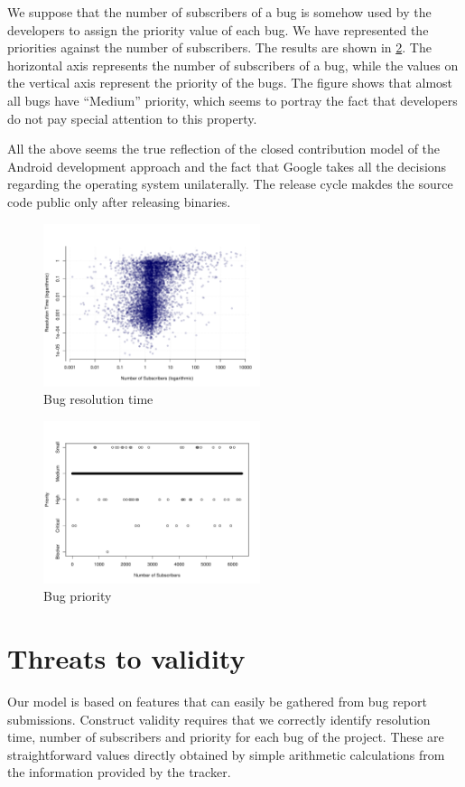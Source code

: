 \documentclass[10pt, conference, compsocconf]{IEEEtran}
\begin{document}
We suppose that the number of  subscribers of a bug is somehow used by the developers to assign the priority value of each bug. We have represented the priorities against the number of subscribers. The results are shown in \ref{fig:stars-priority}. The horizontal axis represents the number of subscribers of a bug, while the values on the vertical axis represent the priority of the bugs. The figure shows that almost all bugs have “Medium” priority, which seems to portray the fact that developers do not pay special attention to this property.

All the above seems the true reflection of the closed contribution model of the Android development approach and the fact that Google takes all the decisions regarding the operating system unilaterally. The release cycle makdes the source code public only after releasing binaries. 

\begin{figure}[!t]
\centering
\includegraphics[width=2.5in]{stars-duration-log}
\caption{Bug resolution time}
\label{fig:stars-duration}
\end{figure}

\begin{figure}[!t]
\centering
\includegraphics[width=2.5in]{stars-priority}
\caption{Bug priority}
\label{fig:stars-priority}
\end{figure}

\section{Threats to validity}
Our model is based on features that can easily be gathered from bug report submissions. Construct validity requires that we correctly identify resolution time, number of subscribers and priority for each bug of the project. These are straightforward values directly obtained by simple arithmetic calculations from the information provided by the tracker.
\end{document}
